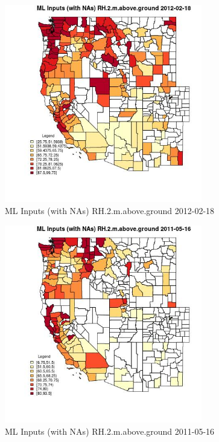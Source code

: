 \begin{figure} 
\centering  
\includegraphics[width=0.77\textwidth]{Code_Outputs/Report_ML_input_PM25_Step4_part_f_de_duplicated_aves_prioritize_24hr_obswNAs_CountyRH2mabovegroundMean2012-02-18.jpg} 
\caption{\label{fig:Report_ML_input_PM25_Step4_part_f_de_duplicated_aves_prioritize_24hr_obswNAsCountyRH2mabovegroundMean2012-02-18}ML Inputs (with NAs) RH.2.m.above.ground 2012-02-18} 
\end{figure} 
 

\begin{figure} 
\centering  
\includegraphics[width=0.77\textwidth]{Code_Outputs/Report_ML_input_PM25_Step4_part_f_de_duplicated_aves_prioritize_24hr_obswNAs_CountyRH2mabovegroundMean2011-05-16.jpg} 
\caption{\label{fig:Report_ML_input_PM25_Step4_part_f_de_duplicated_aves_prioritize_24hr_obswNAsCountyRH2mabovegroundMean2011-05-16}ML Inputs (with NAs) RH.2.m.above.ground 2011-05-16} 
\end{figure} 
 

